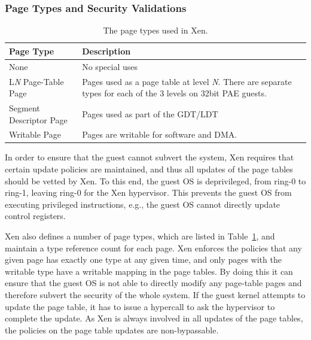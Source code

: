 \subsubsection{Page Types and Security Validations}\label{sec:pv-security}
\begin{table}[!ht]
\begin{center}
\begin{tabular}{|p{1.7cm}|p{4.3cm}|}
\hline
{\textbf{Page Type}}  & {\textbf{Description}}     \\ \hline
None & No special uses \\ \hline
L\emph{N} Page-Table Page & Pages used as a page table at level \emph{N}. There are separate types for each of the 3 levels on 32bit PAE guests. \\ \hline
Segment Descriptor Page & Pages used as part of the GDT/LDT \\ \hline
Writable Page & Pages are writable for software and DMA. \\ \hline
\end{tabular}
\end{center}
\caption{The page types used in Xen.}
\label{tab:pagetype}
\end{table}

In order to ensure that the guest cannot subvert the system, Xen requires that certain update policies are maintained,
and thus all updates of the page tables should be vetted by Xen.
To this end, the guest OS is deprivileged, from ring-0 to ring-1, leaving ring-0 for the Xen hypervisor.
This prevents the guest OS from executing privileged instructions, e.g., the guest OS cannot directly update control registers.

Xen also defines a number of page types, which are listed in Table~\ref{tab:pagetype}, and maintain a type reference count for each page.
Xen enforces the policies that any given page has exactly one type at any given time,
and only pages with the writable type have a writable mapping in the page tables.
By doing this it can ensure that the guest OS is not able to directly modify any page-table pages and therefore subvert the security of the whole system.
If the guest kernel attempts to update the page table, it has to issue a hypercall to ask the hypervisor to complete the update.
As Xen is always involved in all updates of the page tables, the policies on the page table updates are non-bypassable.

